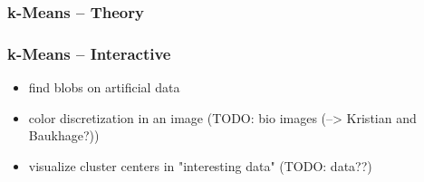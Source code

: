 \begin{frame}
    \frametitle{k-Means -- Theory}
\end{frame}

\begin{frame}
    \frametitle{k-Means -- Interactive}
    \begin{itemize}
        \item  find blobs on artificial data
        \item  color discretization in an image (TODO: bio images (--> Kristian and Baukhage?))
        \item  visualize cluster centers in "interesting data" (TODO: data??)
    \end{itemize}
\end{frame}

